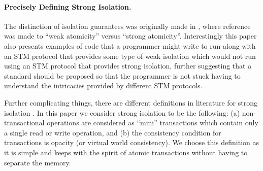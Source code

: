 \paragraph{Precisely Defining Strong Isolation.}

The  distinction  of isolation guarantees  was  originally  made  in
\cite{blundell06},  where   reference  was  made   to  {}``weak
atomicity'' versus {}``strong atomicity''.
Interestingly this paper also presents examples of code that a programmer
might write to run along with an STM protocol that provides some type of weak
isolation which would not run using an STM protocol that provides strong isolation,
further suggesting that a standard should be proposed so that the programmer
is not stuck having to understand the intricacies provided by different STM
protocols.

Further complicating things, there  are different  definitions in  literature for  strong 
isolation \cite{blundell06,ma07,harris06}.
In this paper we consider strong isolation to be the following:
(a) non-transactional   operations   are   considered  as ``mini''
transactions which contain only a single  read or 
write operation, and (b) the consistency condition for transactions is opacity
(or virtual world consistency).
We choose this definition as it is simple and keeps with the spirit of atomic transactions
without having to separate the memory.
 
